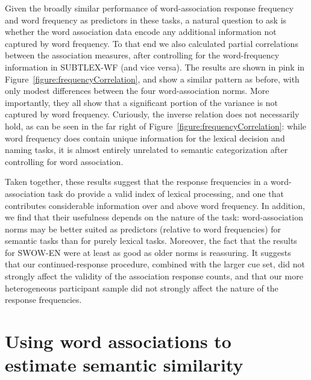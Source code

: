 \documentclass[a4paper,doc,natbib,floatsintext]{apa6}
\begin{document}
Given the broadly similar performance of word-association response frequency and word frequency as predictors in these tasks, a natural question to ask is whether the word association data encode any additional information not captured by word frequency. To that end we also calculated partial correlations between the association measures, after controlling for the word-frequency information in SUBTLEX-WF (and vice versa). The results are shown in pink in Figure~\ref{figure:frequencyCorrelation}, and show a similar pattern as before, with only modest differences between the four word-association norms. More importantly, they all show that a significant portion of the variance is not captured by word frequency. Curiously, the inverse relation does not necessarily hold, as can be seen in the far right of Figure~\ref{figure:frequencyCorrelation}: while word frequency does contain unique information for the lexical decision and naming tasks, it is almost entirely unrelated to semantic categorization after controlling for word association.

Taken together, these results suggest that the response frequencies in a word-association task do provide a valid index of lexical processing, and one that contributes considerable information over and above word frequency. In addition, we find that their usefulness depends on the nature of the task: word-association norms may be better suited as predictors (relative to word frequencies) for semantic tasks than for purely lexical tasks. Moreover, the fact that the results for SWOW-EN were at least as good as older norms is reassuring. It suggests that our continued-response procedure, combined with the larger cue set, did not strongly affect the validity of the association response counts, and that our more heterogeneous participant sample did not strongly affect the nature of the response frequencies.

\section{Using word associations to estimate semantic similarity}
\end{document}
